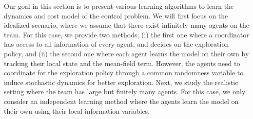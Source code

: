 \documentclass[twoside,11pt]{article}
\begin{document}
Our goal in this section is to present various learning algorithms to learn the dynamics and cost model of the control problem. We will first focus on the idealized scenario, where we assume that there exist infinitely many agents on the team. For this case, we provide two methods; (i) the first one where a coordinator has access to all information of every agent, and decides on the exploration policy, and (ii) the second one where each agent learns the model on their own by tracking their local state and the mean-field term. However, the agents need to coordinate for the exploration policy through a common randomness variable to induce stochastic dynamics for better exploration. Next, we study the realistic setting where the team has large but finitely many agents. For this case, we only consider an independent learning method where the agents learn the model on their own using their local information variables. 


\end{document}
